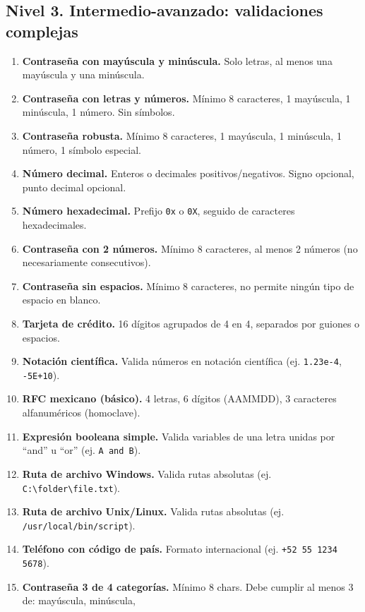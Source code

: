 \documentclass[12pt]{article}
\newcommand{\espacioalumno}{%
  \begin{flushleft}
  \vspace{5cm}
  \end{flushleft}
}
\begin{document}
{\subsection{Nivel 3. Intermedio-avanzado: validaciones complejas}
\begin{enumerate}[label=\textbf{Ejercicio \arabic*.}, start=31]
\item \textbf{Contraseña con mayúscula y minúscula.} Solo letras, al menos una mayúscula y una minúscula.
  \vspace{4.5cm}
\item \textbf{Contraseña con letras y números.} Mínimo 8 caracteres, 1 mayúscula, 1 minúscula, 1 número. Sin símbolos.
  \vspace{4.5cm}
\item \textbf{Contraseña robusta.} Mínimo 8 caracteres, 1 mayúscula, 1 minúscula, 1 número, 1 símbolo especial.
  \vspace{4.5cm}
\item \textbf{Número decimal.} Enteros o decimales positivos/negativos. Signo opcional, punto decimal opcional.
\espacioalumno
\item \textbf{Número hexadecimal.} Prefijo \texttt{0x} o \texttt{0X}, seguido de caracteres hexadecimales.
\espacioalumno
\item \textbf{Contraseña con 2 números.} Mínimo 8 caracteres, al menos 2 números (no necesariamente consecutivos).
\espacioalumno
\item \textbf{Contraseña sin espacios.} Mínimo 8 caracteres, no permite ningún tipo de espacio en blanco.
  \vspace{4.5cm}
\item \textbf{Tarjeta de crédito.} 16 dígitos agrupados de 4 en 4, separados por guiones o espacios.
  \vspace{4.5cm}
\item \textbf{Notación científica.} Valida números en notación científica (ej. \texttt{1.23e-4}, \texttt{-5E+10}).
  \vspace{4.5cm}
\item \textbf{RFC mexicano (básico).} 4 letras, 6 dígitos (AAMMDD), 3 caracteres alfanuméricos (homoclave).
\espacioalumno
\item \textbf{Expresión booleana simple.} Valida variables de una letra unidas por ``and'' u ``or'' (ej. \texttt{A and B}).
  \vspace{4.5cm}
\item \textbf{Ruta de archivo Windows.} Valida rutas absolutas (ej. \texttt{C:\textbackslash folder\textbackslash file.txt}).
  \vspace{4.5cm}
\item \textbf{Ruta de archivo Unix/Linux.} Valida rutas absolutas (ej. \texttt{/usr/local/bin/script}).
  \vspace{4.5cm}
\item \textbf{Teléfono con código de país.} Formato internacional (ej. \texttt{+52 55 1234 5678}).
  \vspace{4.5cm}
\item \textbf{Contraseña 3 de 4 categorías.} Mínimo 8 chars. Debe cumplir al menos 3 de: mayúscula, minúscula,   \vspace{4.5cm}
\end{enumerate}

}
\end{document}
